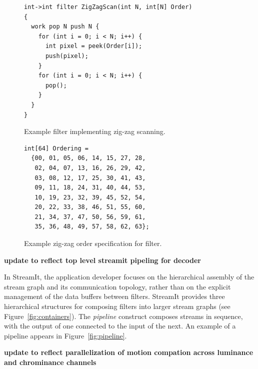 \begin{figure}[t]
\begin{scriptsize}
\begin{verbatim}
int->int filter ZigZagScan(int N, int[N] Order)
{
  work pop N push N {
    for (int i = 0; i < N; i++) {
      int pixel = peek(Order[i]);
      push(pixel);
    }
    for (int i = 0; i < N; i++) {
      pop();
    }
  }
}
\end{verbatim}
\end{scriptsize}
\vspace{-3pt}
\caption{Example filter implementing zig-zag scanning.}
\label{fig:zigzag-filter}
\end{figure}

\begin{figure}[t]
\begin{scriptsize}
\begin{verbatim}
int[64] Ordering = 
  {00, 01, 05, 06, 14, 15, 27, 28,
   02, 04, 07, 13, 16, 26, 29, 42,
   03, 08, 12, 17, 25, 30, 41, 43,
   09, 11, 18, 24, 31, 40, 44, 53,
   10, 19, 23, 32, 39, 45, 52, 54,
   20, 22, 33, 38, 46, 51, 55, 60,
   21, 34, 37, 47, 50, 56, 59, 61,
   35, 36, 48, 49, 57, 58, 62, 63};
\end{verbatim}
\end{scriptsize}
\vspace{-3pt}
\caption{Example zig-zag order specification for filter.}
\label{fig:zigzag-order}
\end{figure}


{\bf update to reflect top level streamit pipeling for decoder}

In StreamIt, the
application developer focuses on the hierarchical assembly of the
stream graph and its communication topology, rather than on the 
explicit management of the data buffers between filters.
StreamIt provides three hierarchical structures for composing filters
into larger stream graphs (see Figure~\ref{fig:containers}). The 
{\it pipeline} construct composes streams in sequence, with the output
of one connected to the input of the next.   An example of a pipeline
appears in Figure~\ref{fig:pipeline}.

{\bf update to reflect parallelization of motion compation across
  luminance and chrominance channels}

